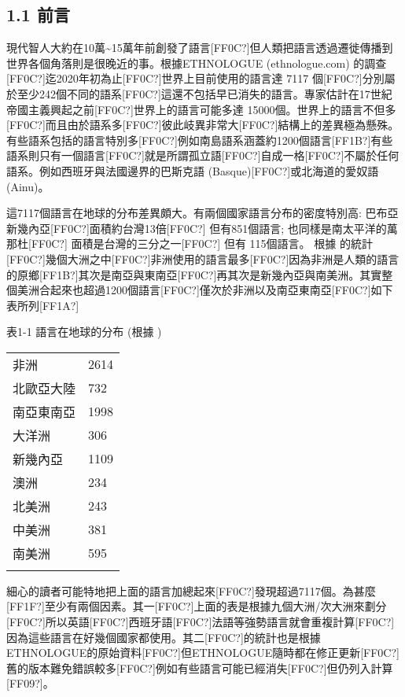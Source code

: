 \subsection{1.1 前言} 

現代智人大約在10萬{\textasciitilde}15萬年前創發了語言[FF0C?]但人類把語言透過遷徙傳播到世界各個角落則是很晚近的事。根據ETHNOLOGUE (ethnologue.com) 的調查[FF0C?]迄2020年初為止[FF0C?]世界上目前使用的語言達 7117 個[FF0C?]分別屬於至少242個不同的語系[FF0C?]這還不包括早已消失的語言。專家估計在17世紀帝國主義興起之前[FF0C?]世界上的語言可能多達 15000個。世界上的語言不但多[FF0C?]而且由於語系多[FF0C?]彼此岐異非常大[FF0C?]結構上的差異極為懸殊。有些語系包括的語言特別多[FF0C?]例如南島語系涵蓋約1200個語言[FF1B?]有些語系則只有一個語言[FF0C?]就是所謂孤立語[FF0C?]自成一格[FF0C?]不屬於任何語系。例如西班牙與法國邊界的巴斯克語 (Basque)[FF0C?]或北海道的愛奴語 (Ainu)。

這7117個語言在地球的分布差異頗大。有兩個國家語言分布的密度特別高: 巴布亞新幾內亞[FF0C?]面積約台灣13倍[FF0C?] 但有851個語言; 也同樣是南太平洋的萬那杜[FF0C?] 面積是台灣的三分之一[FF0C?] 但有 115個語言。 根據\citet{Nettle1999} 的統計[FF0C?]幾個大洲之中[FF0C?]非洲使用的語言最多[FF0C?]因為非洲是人類的語言的原鄉[FF1B?]其次是南亞與東南亞[FF0C?]再其次是新幾內亞與南美洲。其實整個美洲合起來也超過1200個語言[FF0C?]僅次於非洲以及南亞東南亞[FF0C?]如下表所列[FF1A?]                               

\begin{styleListParagraph}
表1-1  語言在地球的分布  (根據 \citet{Nettle1999})
\end{styleListParagraph}

\tablefirsthead{}

\tabletail{}
\tablelasttail{}
\begin{tabularx}{\textwidth}{XX}
\lsptoprule

非洲 & 2614\\
北歐亞大陸 & 732\\
南亞東南亞 & 1998\\
大洋洲 & 306\\
新幾內亞 & 1109\\
澳洲 & 234\\
北美洲 & 243\\
中美洲 & 381\\
南美洲 & 595\\
\lspbottomrule
\end{tabularx}
細心的讀者可能特地把上面的語言加總起來[FF0C?]發現超過7117個。為甚麼[FF1F?]至少有兩個因素。其一[FF0C?]上面的表是根據九個大洲/次大洲來劃分[FF0C?]所以英語[FF0C?]西班牙語[FF0C?]法語等強勢語言就會重複計算[FF0C?]因為這些語言在好幾個國家都使用。其二[FF0C?]\citet{Nettle1999}的統計也是根據 ETHNOLOGUE的原始資料[FF0C?]但ETHNOLOGUE隨時都在修正更新[FF0C?]舊的版本難免錯誤較多[FF0C?]例如有些語言可能已經消失[FF0C?]但仍列入計算[FF09?]。

